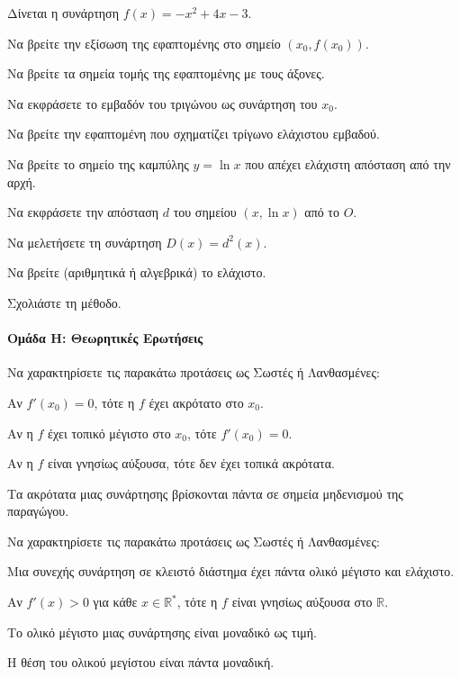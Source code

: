 \documentclass[11pt,a4paper,modern]{FFExercises}
\begin{document}
\askhsh
Δίνεται η συνάρτηση $f(x) = -x^2 + 4x - 3$.
\begin{alist}
    \item Να βρείτε την εξίσωση της εφαπτομένης στο σημείο $(x_0, f(x_0))$.
    \item Να βρείτε τα σημεία τομής της εφαπτομένης με τους άξονες.
    \item Να εκφράσετε το εμβαδόν του τριγώνου ως συνάρτηση του $x_0$.
    \item Να βρείτε την εφαπτομένη που σχηματίζει τρίγωνο ελάχιστου εμβαδού.
\end{alist}

\askhsh
Να βρείτε το σημείο της καμπύλης $y = \ln x$ που απέχει ελάχιστη απόσταση από την αρχή.
\begin{alist}
    \item Να εκφράσετε την απόσταση $d$ του σημείου $(x, \ln x)$ από το $O$.
    \item Να μελετήσετε τη συνάρτηση $D(x) = d^2(x)$.
    \item Να βρείτε (αριθμητικά ή αλγεβρικά) το ελάχιστο.
    \item Σχολιάστε τη μέθοδο.
\end{alist}

\paragraph{Ομάδα Η: Θεωρητικές Ερωτήσεις}

\askhsh
Να χαρακτηρίσετε τις παρακάτω προτάσεις ως Σωστές ή Λανθασμένες:
\begin{alist}
    \item Αν $f'(x_0) = 0$, τότε η $f$ έχει ακρότατο στο $x_0$.
    \item Αν η $f$ έχει τοπικό μέγιστο στο $x_0$, τότε $f'(x_0) = 0$.
    \item Αν η $f$ είναι γνησίως αύξουσα, τότε δεν έχει τοπικά ακρότατα.
    \item Τα ακρότατα μιας συνάρτησης βρίσκονται πάντα σε σημεία μηδενισμού της παραγώγου.
\end{alist}

\askhsh
Να χαρακτηρίσετε τις παρακάτω προτάσεις ως Σωστές ή Λανθασμένες:
\begin{alist}
    \item Μια συνεχής συνάρτηση σε κλειστό διάστημα έχει πάντα ολικό μέγιστο και ελάχιστο.
    \item Αν $f'(x) > 0$ για κάθε $x \in \mathbb{R}^*$, τότε η $f$ είναι γνησίως αύξουσα στο $\mathbb{R}$.
    \item Το ολικό μέγιστο μιας συνάρτησης είναι μοναδικό ως τιμή.
    \item Η θέση του ολικού μεγίστου είναι πάντα μοναδική.
\end{alist}
\end{document}
